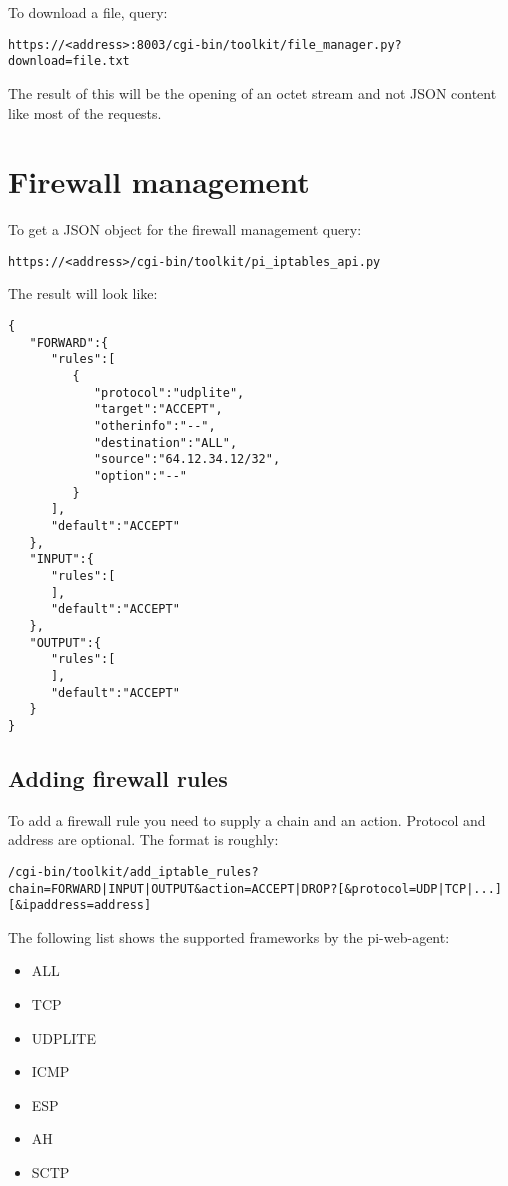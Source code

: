 \documentclass[12pt]{article}
\begin{document}
 To download a file, query:
 
 
 \texttt{https://<address>:8003/cgi-bin/toolkit/file\_manager.py?download=file.txt}
 
 
 The result of this will be the opening of an octet stream and not JSON content like most of the requests.
  
  \section{Firewall management}
  To get a JSON object for the firewall management query:
  
 
 \texttt{https://<address>/cgi-bin/toolkit/pi\_iptables\_api.py}
















 The result will look like:
 
 \begin{verbatim}
{
   "FORWARD":{
      "rules":[
         {
            "protocol":"udplite",
            "target":"ACCEPT",
            "otherinfo":"--",
            "destination":"ALL",
            "source":"64.12.34.12/32",
            "option":"--"
         }
      ],
      "default":"ACCEPT"
   },
   "INPUT":{
      "rules":[
      ],
      "default":"ACCEPT"
   },
   "OUTPUT":{
      "rules":[
      ],
      "default":"ACCEPT"
   }
}
 \end{verbatim}
  
  
  \subsection{Adding firewall rules}
  
  To add a firewall rule you need to supply a chain and an action. Protocol and address are optional. The format is roughly:
  
  
  \texttt{/cgi-bin/toolkit/add\_iptable\_rules?chain=FORWARD|INPUT|OUTPUT\&action=ACCEPT|DROP?[\&protocol=UDP|TCP|...][\&ipaddress=address]}
  
  
  The following list shows the supported frameworks by the pi-web-agent:
  
  
  \begin{itemize}
      \item ALL
      \item TCP
      \item UDPLITE
      \item ICMP
      \item ESP
      \item AH
      \item SCTP
  \end{itemize}
  
\end{document}
